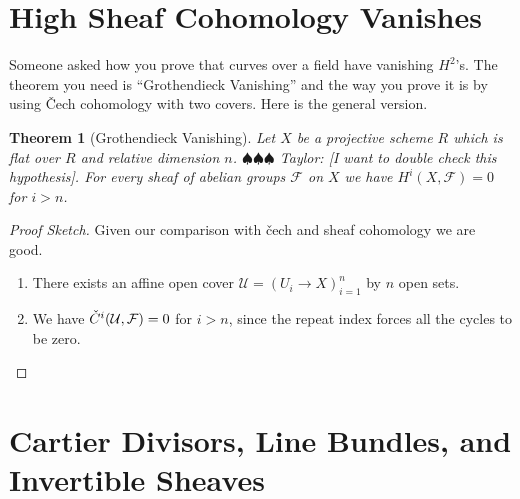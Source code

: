 \documentclass[12pt]{article}
\numberwithin{equation}{section}
\newtheorem{theorem}{Theorem}[subsection]
\theoremstyle{definition}
\theoremstyle{remark}
\newcommand{\Fcal}{\mathcal{F}}
\newcommand{\Ucal}{\mathcal{U}}
\newcommand{\Cv}{\Check{C}}
\newcommand{\taylor}[1]{{\color{blue} \sf $\spadesuit\spadesuit\spadesuit$ Taylor: [#1]}}
\begin{document}

\section{High Sheaf Cohomology Vanishes}

Someone asked how you prove that curves over a field have vanishing $H^2$'s. 
The theorem you need is ``Grothendieck Vanishing'' and the way you prove it is by using \v{C}ech cohomology with two covers. 
Here is the general version. 
\begin{theorem}[Grothendieck Vanishing]
	Let $X$ be a projective scheme $R$ which is flat over $R$ and relative dimension $n$. \taylor{I want to double check this hypothesis}. For every sheaf of abelian groups $\Fcal$ on $X$ we have $H^i(X,\Fcal)=0$ for $i>n$.
\end{theorem}
\begin{proof}[Proof Sketch]
	Given our comparison with \v{c}ech and sheaf cohomology we are good.
	\begin{enumerate}
		\item There exists an affine open cover $\Ucal = (U_i \to X)_{i=1}^n$ by $n$ open sets. 
		\item We have $\Cv^i(\Ucal,\Fcal)=0$ for $i>n$, since the repeat index forces all the cycles to be zero. 
	\end{enumerate}
\end{proof}

\section{Cartier Divisors, Line Bundles, and Invertible Sheaves}
\end{document}
